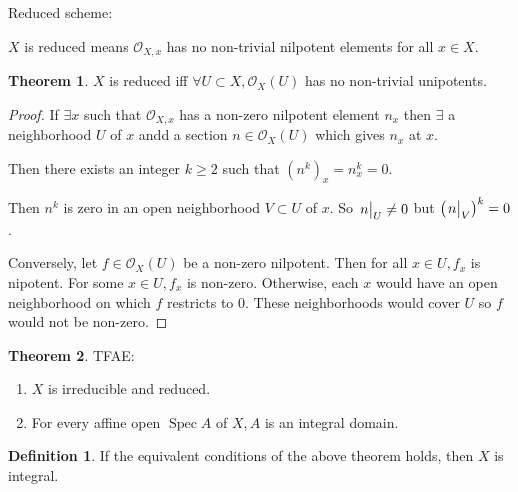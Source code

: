 \documentclass{article}
\theoremstyle{definition}
\newtheorem*{definition}{Definition}
\newtheorem{theorem}{Theorem}
\begin{document}
    Reduced scheme:

    \(X\) is reduced means \(\mathcal{O}_{X,x}\) has no non-trivial nilpotent elements for all \(x \in X\).
    
    \begin{theorem}
        \(X\) is reduced iff \(\forall U \subset X, \mathcal{O}_X(U)\) has no non-trivial unipotents.
    \end{theorem}

    \begin{proof}
        If \(\exists x\) such that \(\mathcal{O}_{X,x}\) has a non-zero nilpotent element \(n_x\) then \(\exists\) a neighborhood \(U\) of \(x\) andd a section \(n\in \mathcal{O}_X(U)\) which gives \(n_x\) at \(x\).

        Then there exists an integer \(k \geq 2\) such that \((n^k)_x = n_x^k = 0\).

        Then \(n^k\) is zero in an open neighborhood \(V \subset U\) of \(x\). So \(\eval{n}_{U} \neq 0\) but \(\left( \eval{n}_{V} \right)^k = 0\).
        
        Conversely, let \(f\in \mathcal{O}_X(U)\) be a non-zero nilpotent. Then for all \(x\in U, f_x\) is nipotent. For some \(x\in U, f_x\) is non-zero. Otherwise, each \(x\) would have an open neighborhood on which \(f\) restricts to \(0\). These neighborhoods would cover \(U\) so \(f\) would not be non-zero.
    \end{proof}

    \begin{theorem}
        TFAE:

        \begin{enumerate}[label=\arabic*)]
            \item \(X\) is irreducible and reduced.
            \item For every affine open \(\operatorname{Spec} A\) of \(X, A\) is an integral domain.  
        \end{enumerate} 
    \end{theorem}

    \begin{definition}
        If the equivalent conditions of the above theorem holds, then \(X\) is integral.
    \end{definition}
\end{document}
